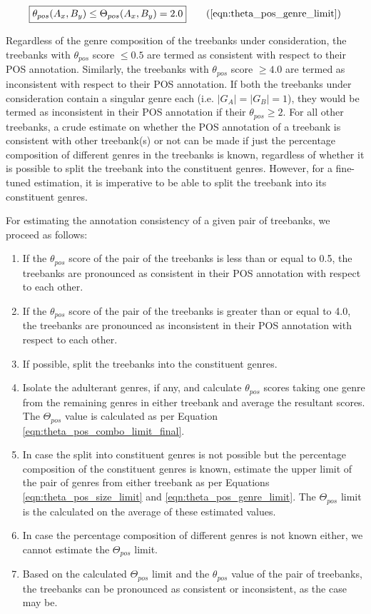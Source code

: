 \begin{equation}
    \boxed{\theta_{pos}(A_{x}, B_{y}) \leq \Theta_{pos}(A_{x}, B_{y}) = 2.0}
\tag{\ref{eqn:theta_pos_genre_limit}}
\end{equation}

Regardless of the genre composition of the treebanks under consideration, the treebanks with $\theta_{pos}$ score $\leq 0.5$ are termed as consistent with respect to their POS annotation. Similarly, the treebanks with $\theta_{pos}$ score $\geq 4.0$ are termed as inconsistent with respect to their POS annotation. If both the treebanks under consideration contain a singular genre each (i.e. $\vert G_{A} \vert = \vert G_{B} \vert = 1$), they would be termed as inconsistent in their POS annotation if their $\theta_{pos} \geq 2$. For all other treebanks, a crude estimate on whether the POS annotation of a treebank is consistent with other treebank(s) or not can be made if just the percentage composition of different genres in the treebanks is known, regardless of whether it is possible to split the treebank into the constituent genres. However, for a fine-tuned estimation, it is imperative to be able to split the treebank into its constituent genres. 

For estimating the annotation consistency of a given pair of treebanks, we proceed as follows:
\begin{enumerate}
    \item If the $\theta_{pos}$ score of the pair of the treebanks is less than or equal to 0.5, the treebanks are pronounced as consistent in their POS annotation with respect to each other.
    \item If the $\theta_{pos}$ score of the pair of the treebanks is greater than or equal to 4.0, the treebanks are pronounced as inconsistent in their POS annotation with respect to each other.
    \item If possible, split the treebanks into the constituent genres.
    \item Isolate the adulterant genres, if any, and calculate $\theta_{pos}$ scores taking one genre from the remaining genres in either treebank and average the resultant scores. The $\Theta_{pos}$ value is calculated as per Equation \ref{eqn:theta_pos_combo_limit_final}.
    \item In case the split into constituent genres is not possible but the percentage composition of the constituent genres is known, estimate the upper limit of the pair of genres from either treebank as per Equations \ref{eqn:theta_pos_size_limit} and \ref{eqn:theta_pos_genre_limit}. The $\Theta_{pos}$ limit is the calculated on the average of these estimated values.
    \item In case the percentage composition of different genres is not known either, we cannot estimate the $\Theta_{pos}$ limit.
    \item Based on the calculated $\Theta_{pos}$ limit and the $\theta_{pos}$ value of the pair of treebanks, the treebanks can be pronounced as consistent or inconsistent, as the case may be.
\end{enumerate}

